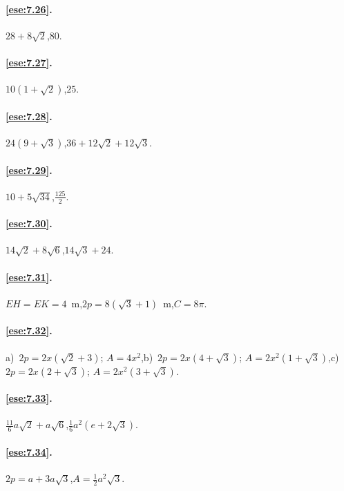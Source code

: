 \paragraph{\ref{ese:7.26}.}
\(28+8\sqrt{2}\),\quad \(80\).

\paragraph{\ref{ese:7.27}.}
\(10(1+\sqrt{2})\),\quad \(25\).

\paragraph{\ref{ese:7.28}.}
\(24(9+\sqrt{3})\),\quad \(36+12\sqrt{2}+12\sqrt{3}\).

\paragraph{\ref{ese:7.29}.}
\(10+5\sqrt{34}\),\quad \(\frac{125}{2}\).

\paragraph{\ref{ese:7.30}.}
\(14\sqrt{2}+8\sqrt{6}\),\quad \(14\sqrt{3}+24\).

\paragraph{\ref{ese:7.31}.}
\(EH=EK=4\)~m,\quad \(2p=8(\sqrt{3}+1)\)~m,\quad \(C=8\pi\).

\paragraph{\ref{ese:7.32}.}
a)~\(2p=2x(\sqrt{2}+3)\); \(A=4x^2\),\quad b)~\(2p=2x(4+\sqrt{3})\); 
\(A=2x^2(1+\sqrt{3})\),\quad c)~\(2p=2x(2+\sqrt{3})\); 
\(A=2x^2(3+\sqrt{3})\).

\paragraph{\ref{ese:7.33}.}
\(\frac{11}{6}a\sqrt{2}+a\sqrt{6}\),\quad \(\frac{1}{6}a^2(e+2\sqrt{3})\).

\paragraph{\ref{ese:7.34}.}
\(2p=a+3a\sqrt{3}\),\quad \(A=\frac{1}{2}a^2\sqrt{3}\).


